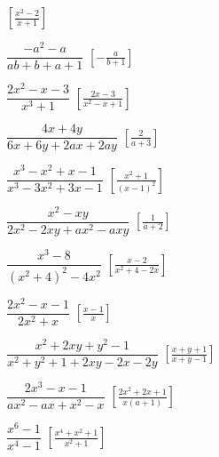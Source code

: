 \begin{esercizio}[\Ast]
\begin{multicols}{2}
\begin{enumeratea}
  \hfill $\left[\frac{x^{2}-2}{x+1}\right]$
 \item $\dfrac{-a^{2}-a}{ab+b+a+1}$
  \hfill $\left[-\frac{a}{b+1}\right]$
 \item $\dfrac{2x^{2}-x-3}{x^{3}+1}$
  \hfill $\left[\frac{2x-3}{x^2-x+1}\right]$
 \item $\dfrac{4x+4y}{6x+6y+2ax+2ay}$
  \hfill $\left[\frac{2}{a+3}\right]$
 \item $\dfrac{x^{3}-x^{2}+x-1}{x^{3}-3x^{2}+3x-1}$
  \hfill $\left[\frac{x^{2}+1}{(x-1)^2}\right]$
 \item $\dfrac{x^{2}-xy}{2x^{2}-2xy+ax^{2}-axy}$
  \hfill $\left[\frac{1}{a+2}\right]$
 \item $\dfrac{x^{3}-8}{\left(x^{2}+4\right)^{2}-4x^{2}}$
  \hfill $\left[\frac{x-2}{x^2+4-2x}\right]$
 \item $\dfrac{2x^{2}-x-1}{2x^{2}+x}$
  \hfill $\left[\frac{x-1}{x}\right]$
 \item $\dfrac{x^{2}+2xy+y^{2}-1}{x^{2}+y^{2}+1+2xy-2x-2y}$
  \hfill $\left[\frac{x+y+1}{x+y-1}\right]$
 \item $\dfrac{2x^{3}-x-1}{ax^{2}-ax+x^{2}-x}$
  \hfill $\left[\frac{2x^2+2x+1}{x(a+1)}\right]$
 \item $\dfrac{x^{6}-1}{x^{4}-1}$
  \hfill $\left[\frac{x^{4}+x^{2}+1}{x^2+1}\right]$
\end{enumeratea}
\end{multicols}
\end{esercizio}

\subsubsection*{}

